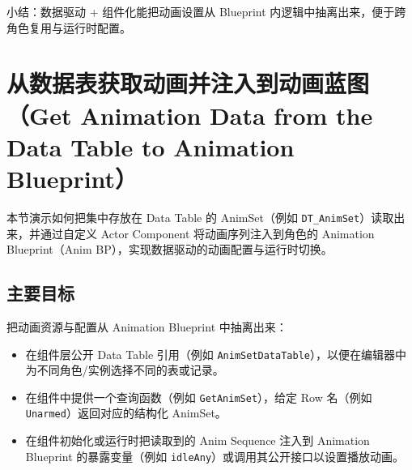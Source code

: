 \documentclass[10pt,CJKmath]{zhbook-v1}
\newcommand{\il}[1]{\texttt{#1}}%
\begin{document}
\bigskip
\noindent 小结：数据驱动 + 组件化能把动画设置从 Blueprint 内逻辑中抽离出来，便于跨角色复用与运行时配置。


\section{从数据表获取动画并注入到动画蓝图（Get Animation Data from the Data Table to Animation Blueprint）}

本节演示如何把集中存放在 Data Table 的 AnimSet（例如 \il{DT_AnimSet}）读取出来，并通过自定义 Actor Component 将动画序列注入到角色的 Animation Blueprint（Anim BP），实现数据驱动的动画配置与运行时切换。

\subsection{主要目标}
把动画资源与配置从 Animation Blueprint 中抽离出来：
\begin{itemize}
  \item 在组件层公开 Data Table 引用（例如 \il{AnimSetDataTable}），以便在编辑器中为不同角色/实例选择不同的表或记录。
  \item 在组件中提供一个查询函数（例如 \il{GetAnimSet}），给定 Row 名（例如 \il{Unarmed}）返回对应的结构化 AnimSet。
  \item 在组件初始化或运行时把读取到的 Anim Sequence 注入到 Animation Blueprint 的暴露变量（例如 \il{idleAny}）或调用其公开接口以设置播放动画。
\end{itemize}
\end{document}
